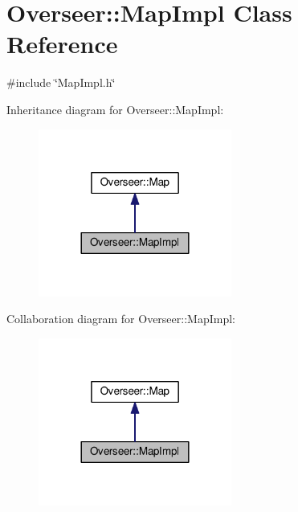 \hypertarget{classOverseer_1_1MapImpl}{}\section{Overseer\+:\+:Map\+Impl Class Reference}
\label{classOverseer_1_1MapImpl}


{\ttfamily \#include \char`\"{}Map\+Impl.\+h\char`\"{}}



Inheritance diagram for Overseer\+:\+:Map\+Impl\+:\nopagebreak
\begin{figure}[H]
\begin{center}
\leavevmode
\includegraphics[width=180pt]{classOverseer_1_1MapImpl__inherit__graph}
\end{center}
\end{figure}


Collaboration diagram for Overseer\+:\+:Map\+Impl\+:\nopagebreak
\begin{figure}[H]
\begin{center}
\leavevmode
\includegraphics[width=180pt]{classOverseer_1_1MapImpl__coll__graph}
\end{center}
\end{figure}
